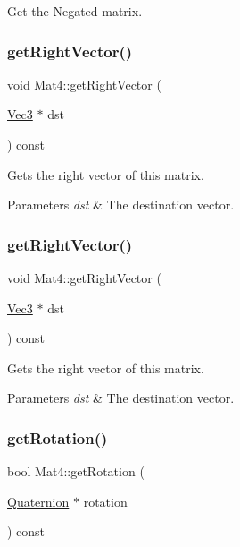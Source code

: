 Get the Negated matrix. \mbox{\label{classMat4_a5154fc9675a1d8fdc136c4a0ac19a41f}} 
\subsubsection{\texorpdfstring{get\+Right\+Vector()}{getRightVector()}\hspace{0.1cm}{\footnotesize\ttfamily [1/2]}}
{\footnotesize\ttfamily void Mat4\+::get\+Right\+Vector (\begin{DoxyParamCaption}\item[{\hyperlink{classVec3}{Vec3} $\ast$}]{dst }\end{DoxyParamCaption}) const}

Gets the right vector of this matrix.


\begin{DoxyParams}{Parameters}
{\em dst} & The destination vector. \\
\hline
\end{DoxyParams}
\mbox{\label{classMat4_a5154fc9675a1d8fdc136c4a0ac19a41f}} 
\subsubsection{\texorpdfstring{get\+Right\+Vector()}{getRightVector()}\hspace{0.1cm}{\footnotesize\ttfamily [2/2]}}
{\footnotesize\ttfamily void Mat4\+::get\+Right\+Vector (\begin{DoxyParamCaption}\item[{\hyperlink{classVec3}{Vec3} $\ast$}]{dst }\end{DoxyParamCaption}) const}

Gets the right vector of this matrix.


\begin{DoxyParams}{Parameters}
{\em dst} & The destination vector. \\
\hline
\end{DoxyParams}
\mbox{\label{classMat4_a585ebfce44ed9fd746a81bfed1e3cccf}} 
\subsubsection{\texorpdfstring{get\+Rotation()}{getRotation()}\hspace{0.1cm}{\footnotesize\ttfamily [1/2]}}
{\footnotesize\ttfamily bool Mat4\+::get\+Rotation (\begin{DoxyParamCaption}\item[{\hyperlink{classQuaternion}{Quaternion} $\ast$}]{rotation }\end{DoxyParamCaption}) const}

